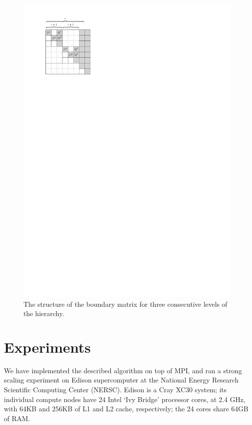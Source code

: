 \begin{figure}
    \centering
    \includegraphics{figs/hierarchy}
    \caption{The structure of the boundary matrix for three consecutive levels of
             the hierarchy.}
    \label{fig:hierarchy}
\end{figure}

\section{Experiments}
\label{sec:experiments}

We have implemented the described algorithm on top of MPI, and ran a strong
scaling experiment on Edison supercomputer at the National Energy Research
Scientific Computing Center (NERSC). Edison is a Cray XC30 system; its
individual compute nodes have 24 Intel `Ivy Bridge' processor cores, at 2.4 GHz,
with 64KB and 256KB of L1 and L2 cache, respectively; the 24 cores share 64GB of RAM.


